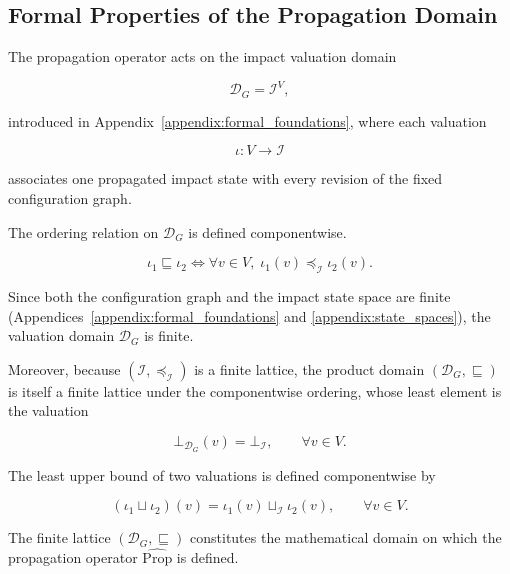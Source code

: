 \documentclass[10pt]{article}
\begin{document}
\subsection{Formal Properties of the Propagation Domain}
\label{appendix:finite_lattice}
The propagation operator acts on the impact valuation domain

\[
\mathcal D_G
=
\mathcal I^V,
\]

introduced in Appendix~\ref{appendix:formal_foundations}, where each valuation

\[
\iota : V \rightarrow \mathcal I
\]

associates one propagated impact state with every revision of the fixed
configuration graph.

The ordering relation on $\mathcal D_G$ is defined componentwise.

\begin{equation}
	\label{eq:product_order}
	\iota_1
	\sqsubseteq
	\iota_2
	\iff
	\forall v\in V,\;
	\iota_1(v)
	\preceq_{\mathcal I}
	\iota_2(v).
\end{equation}

Since both the configuration graph and the impact state space are finite (Appendices~\ref{appendix:formal_foundations} and
\ref{appendix:state_spaces}), the valuation domain
$\mathcal D_G$ is finite.

Moreover, because
$\left(\mathcal I,\preceq_{\mathcal I}\right)$
is a finite lattice, the product domain
$\left(\mathcal D_G,\sqsubseteq\right)$
is itself a finite lattice under the componentwise ordering, whose least element is the valuation

\begin{equation}
	\label{eq:bottom_valuation}
	\bot_{\mathcal D_G}(v)
	=
	\bot_{\mathcal I},
	\qquad
	\forall v\in V.
\end{equation}

The least upper bound of two valuations is defined componentwise by

\begin{equation}
	\label{eq:valuation_join}
	(\iota_1
	\sqcup
	\iota_2)(v)
	=
	\iota_1(v)
	\sqcup_{\mathcal I}
	\iota_2(v),
	\qquad
	\forall v\in V.
\end{equation}

The finite lattice
$\left(\mathcal D_G,\sqsubseteq\right)$
constitutes the mathematical domain on which the propagation operator
$\widehat{\mathrm{Prop}}$ is defined.
\end{document}
